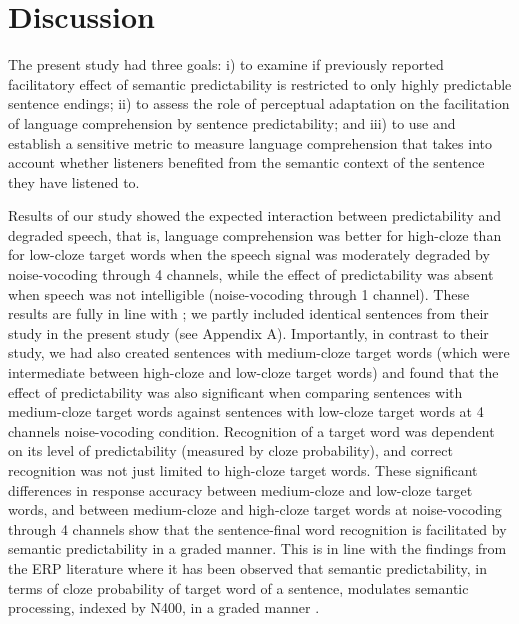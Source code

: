 \documentclass[a4paper, nobind]{templates/ociamthesis}
\begin{document}
\hypertarget{discussion}{%
\section{Discussion}\label{discussion}}

The present study had three goals: i) to examine if previously reported facilitatory effect of semantic predictability is restricted to only highly predictable sentence endings;
ii) to assess the role of perceptual adaptation on the facilitation of language comprehension by sentence predictability; and
iii) to use and establish a sensitive metric to measure language comprehension that takes into account whether listeners benefited from the semantic context of the sentence they have listened to.

Results of our study showed the expected interaction between predictability and degraded speech, that is, language comprehension was better for high-cloze than for low-cloze target words when the speech signal was moderately degraded by noise-vocoding through 4 channels, while the effect of predictability was absent when speech was not intelligible (noise-vocoding through 1 channel).
These results are fully in line with \textcite{Obleser2010};
we partly included identical sentences from their study in the present study (see Appendix A).
Importantly, in contrast to their study, we had also created sentences with medium-cloze target words (which were intermediate between high-cloze and low-cloze target words) and found that the effect of predictability was also significant when comparing sentences with medium-cloze target words against sentences with low-cloze target words at 4 channels noise-vocoding condition.
Recognition of a target word was dependent on its level of predictability (measured by cloze probability), and correct recognition was not just limited to high-cloze target words.
These significant differences in response accuracy between medium-cloze and low-cloze target words, and between medium-cloze and high-cloze target words at noise-vocoding through 4 channels show that the sentence-final word recognition is facilitated by semantic predictability in a graded manner.
This is in line with the findings from the ERP literature where it has been observed that semantic predictability, in terms of cloze probability of target word of a sentence, modulates semantic processing, indexed by N400, in a graded manner \autocite{Delong2005,Wlotko2012,Nieuwland2018}.
\end{document}
